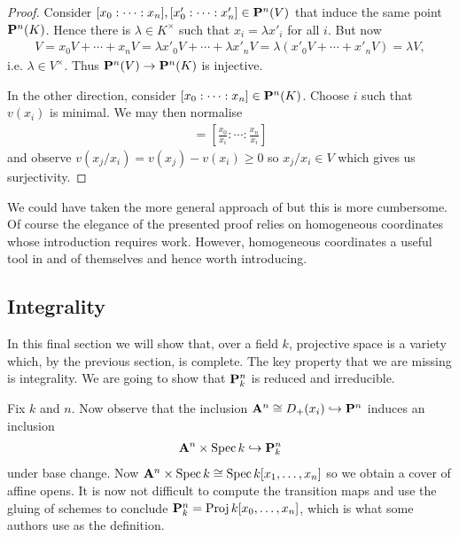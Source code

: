 \documentclass{article}
\begin{document}
\begin{theorem}
\begin{proof}
    Consider
    $[x_0:\cdots:x_n],[x'_0:\cdots:x'_n]\in\mathbf{P}^{n}_{}(V)$
    that induce the same point $\mathbf{P}^{n}_{}(K)$. Hence
    there is $\lambda\in K^\times$ such that $x_i = \lambda x'_i$
    for all $i$. But now
    \begin{align*}
      V = x_0V + \cdots + x_nV = \lambda x'_0 V + \cdots + \lambda x'_n V = \lambda (x'_0 V + \cdots + x'_n V) = \lambda V,
    \end{align*}
    i.e. $\lambda \in V^\times$. Thus
    $\mathbf{P}^{n}_{}(V)\to\mathbf{P}^{n}_{}(K)$ is injective.

    In the other direction, consider
    $[x_0:\cdots:x_n]\in \mathbf{P}^{n}_{}(K)$. Choose $i$ such
    that $v(x_i)$ is minimal. We may then normalise
    \begin{align*}
      [x_0:\cdots:x_n] = \left[{\frac{x_0}{x_i}: \cdots : \frac{x_n}{x_i}}\right]
    \end{align*}
    and observe $v(x_j/x_i) = v(x_j)-v(x_i) \geq 0$ so
    $x_j/x_i\in V$ which gives us surjectivity.
  \end{proof}
\end{theorem}

We could have taken the more general approach of
\cite[\href{https://stacks.math.columbia.edu/tag/01MF}{Tag 01MF}]{stacks-project} but this is more cumbersome. Of course the elegance
of the presented proof relies on homogeneous coordinates whose
introduction requires work. However, homogeneous coordinates a
useful tool in and of themselves and hence worth introducing.

\subsection{Integrality}

In this final section we will show that, over a field $k$,
projective space is a variety which, by the previous section,
is complete. The key property that we are missing is integrality.
We are going to show that $\mathbf{P}^{n}_{k}$ is reduced and irreducible.


Fix $k$ and $n$. Now observe
that the inclusion
$\mathbf{A}^{n}_{}\cong D_+(x_i) \hookrightarrow \mathbf{P}^{n}_{}$
induces an inclusion
\begin{align*}
  \mathbf{A}^{n}_{}\times\operatorname{Spec} k \hookrightarrow \mathbf{P}^{n}_{k}
\end{align*}
under base change. Now
$\mathbf{A}^{n}_{}\times\operatorname{Spec} k \cong \operatorname{Spec} k[x_1,\ldots,x_n]$
so we obtain a cover of affine opens. It is now not difficult to
compute the transition maps and use the gluing of schemes
to conclude $\mathbf{P}^{n}_{k}=\operatorname{Proj} k[x_0,\ldots,x_n]$,
which is what some authors use as the definition.
\end{document}
